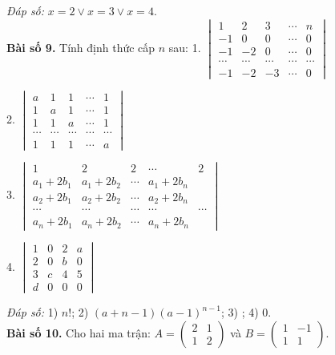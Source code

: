     \textit{Đáp số:} \(x = 2 \lor x = 3 \lor x = 4\).\\   
\textbf{Bài số 9.} Tính định thức cấp \(n\) sau:
    1. \(\begin{vmatrix}
    1 & 2 & 3 & \cdots & n \\
    -1 & 0 & 0 & \cdots & 0 \\
    -1 & -2 & 0 & \cdots & 0 \\
    \cdots & \cdots & \cdots & \cdots & \cdots \\
    -1 & -2 & -3 & \cdots & 0
    \end{vmatrix}\)
    
    2. \(\begin{vmatrix}
    a & 1 & 1 & \cdots & 1 \\
    1 & a & 1 & \cdots & 1 \\
    1 & 1 & a & \cdots & 1 \\
    \cdots & \cdots & \cdots & \cdots & \cdots \\
    1 & 1 & 1 & \cdots & a
    \end{vmatrix}\)
    \vspace*{0.5cm}

    3. \(\begin{vmatrix}
    1 & 2 & 2 & \cdots & 2 \\
    a_1 + 2b_1 & a_1 + 2b_2 & \cdots & a_1 + 2b_n \\
    a_2 + 2b_1 & a_2 + 2b_2 & \cdots & a_2 + 2b_n \\
    \cdots & \cdots & \cdots & \cdots & \cdots \\
    a_n + 2b_1 & a_n + 2b_2 & \cdots & a_n + 2b_n
    \end{vmatrix}\)
    \vspace*{0.5cm}

    4. \(\begin{vmatrix}
    1 & 0 & 2 & a \\
    2 & 0 & b & 0 \\
    3 & c & 4 & 5 \\
    d & 0 & 0 & 0
    \end{vmatrix}\)
    \vspace*{0.5cm}

    \textit{Đáp số:} 
    1) \(n!\);
    2) \((a + n - 1)(a - 1)^{n-1}\);
    3) ;
    4) \(0\).\\ 
\textbf{Bài số 10.} Cho hai ma trận: \( A = \begin{pmatrix}
    2 & 1 \\
    1 & 2
    \end{pmatrix} \) và \( B = \begin{pmatrix}
    1 & -1 \\
    1 & 1
    \end{pmatrix} \).
    

